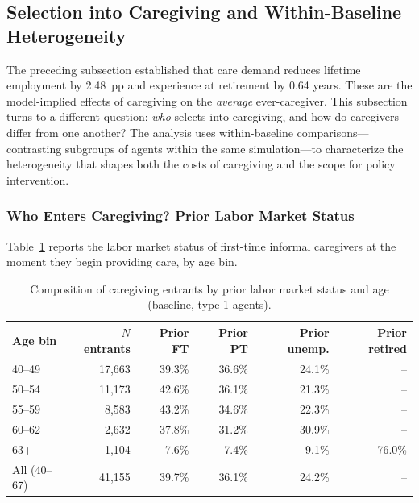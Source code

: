 \subsection{Selection into Caregiving and Within-Baseline Heterogeneity}
\label{subsec:within_baseline_heterogeneity}

The preceding subsection established that care demand reduces lifetime employment by 2.48~pp and experience at retirement by 0.64 years. These are the model-implied effects of caregiving on the \textit{average} ever-caregiver. This subsection turns to a different question: \textit{who} selects into caregiving, and how do caregivers differ from one another? The analysis uses within-baseline comparisons---contrasting subgroups of agents within the same simulation---to characterize the heterogeneity that shapes both the costs of caregiving and the scope for policy intervention.

\subsubsection{Who Enters Caregiving? Prior Labor Market Status}

Table~\ref{tab:entrant_composition} reports the labor market status of first-time informal caregivers at the moment they begin providing care, by age bin.

\begin{table}[htbp]
  \centering
  \caption{Composition of caregiving entrants by prior labor market status and age (baseline, type-1 agents).}
  \label{tab:entrant_composition}
  \small
  \begin{tabular}{lrrrrr}
    \toprule
    Age bin & $N$ entrants & Prior FT & Prior PT & Prior unemp. & Prior retired \\
    \midrule
    40--49 & 17,663 & 39.3\% & 36.6\% & 24.1\% & -- \\
    50--54 & 11,173 & 42.6\% & 36.1\% & 21.3\% & -- \\
    55--59 & 8,583 & 43.2\% & 34.6\% & 22.3\% & -- \\
    60--62 & 2,632 & 37.8\% & 31.2\% & 30.9\% & -- \\
    63+ & 1,104 & 7.6\% & 7.4\% & 9.1\% & 76.0\% \\
    \addlinespace
    All (40--67) & 41,155 & 39.7\% & 36.1\% & 24.2\% & -- \\
    \bottomrule
  \end{tabular}
\end{table}

